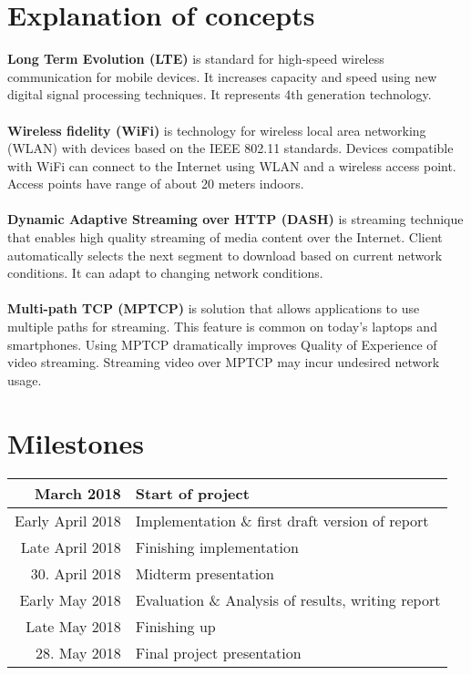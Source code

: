 \documentclass{llncs}
\begin{document}
\section{Explanation of concepts}
\textbf{Long Term Evolution (LTE)} is standard for high-speed wireless communication for mobile devices. It increases capacity and speed using new digital signal processing techniques. It represents 4th generation technology. \\  \\
\textbf{Wireless fidelity (WiFi)} is technology for wireless local area networking (WLAN) with devices based on the IEEE 802.11 standards. Devices compatible with WiFi can connect to the Internet using WLAN and a wireless access point. Access points have range of about 20 meters indoors. \\ \\
\textbf{Dynamic Adaptive Streaming over HTTP (DASH) } is streaming technique that enables high quality streaming of media content over the Internet. Client automatically selects the next segment to download based on current network conditions. It can adapt to changing network conditions.\\  \\
\textbf{Multi-path TCP (MPTCP)} is solution that allows applications to use multiple paths for streaming. This feature is common on today's laptops and smartphones. Using MPTCP dramatically improves Quality of Experience of video streaming. Streaming video over MPTCP may incur undesired network usage. 

\section{Milestones}
\begin{center}
\begin{tabular}{ | r | l |} \hline
March 2018 & Start of project \\ \hline
Early April 2018 & Implementation \& first draft version of report \\ \hline
Late April 2018 & Finishing implementation \\ \hline
30. April 2018 & Midterm presentation \\ \hline
Early May 2018 & Evaluation \& Analysis of results, writing report \\ \hline
Late May 2018 & Finishing up \\ \hline
28. May 2018 & Final project presentation \\ \hline

\end{tabular}
\end{center}
\end{document}
